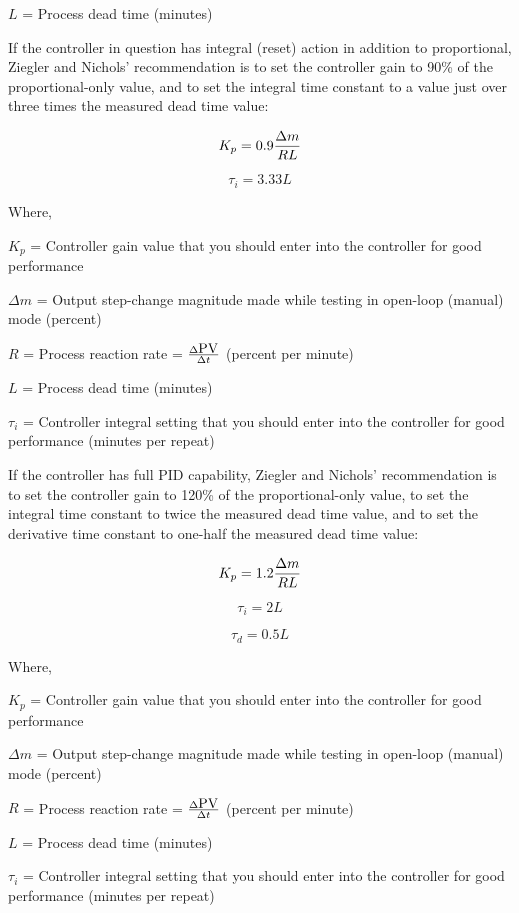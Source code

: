 $L$ = Process dead time (minutes)

\vskip 10pt

If the controller in question has integral (reset) action in addition to proportional, Ziegler and Nichols' recommendation is to set the controller gain to 90\% of the proportional-only value, and to set the integral time constant to a value just over three times the measured dead time value:

$$K_p = 0.9 {\Delta m \over {R L}}$$

$$\tau_i = 3.33 L$$

\noindent
Where,

$K_p$ = Controller gain value that you should enter into the controller for good performance

$\Delta m$ = Output step-change magnitude made while testing in open-loop (manual) mode (percent)

$R$ = Process reaction rate = ${\Delta \hbox{PV} \over \Delta t}$ (percent per minute)

$L$ = Process dead time (minutes)

$\tau_i$ = Controller integral setting that you should enter into the controller for good performance (minutes per repeat)

\vskip 10pt

\filbreak

If the controller has full PID capability, Ziegler and Nichols' recommendation is to set the controller gain to 120\% of the proportional-only value, to set the integral time constant to twice the measured dead time value, and to set the derivative time constant to one-half the measured dead time value:

$$K_p = 1.2 {\Delta m \over {R L}}$$

$$\tau_i = 2 L$$

$$\tau_d = 0.5 L$$

\noindent
Where,

$K_p$ = Controller gain value that you should enter into the controller for good performance

$\Delta m$ = Output step-change magnitude made while testing in open-loop (manual) mode (percent)

$R$ = Process reaction rate = ${\Delta \hbox{PV} \over \Delta t}$ (percent per minute)

$L$ = Process dead time (minutes)

$\tau_i$ = Controller integral setting that you should enter into the controller for good performance (minutes per repeat)

